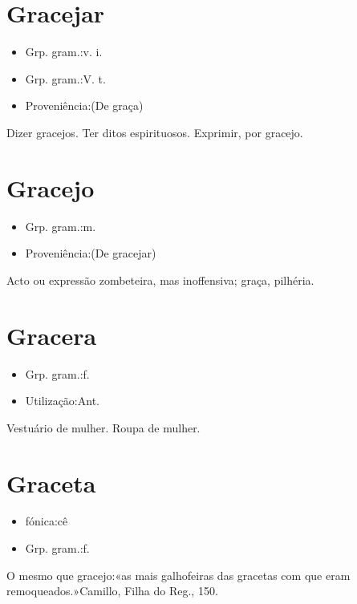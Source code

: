 \section{Gracejar}
\begin{itemize}
\item {Grp. gram.:v. i.}
\end{itemize}
\begin{itemize}
\item {Grp. gram.:V. t.}
\end{itemize}
\begin{itemize}
\item {Proveniência:(De \textunderscore graça\textunderscore )}
\end{itemize}
Dizer gracejos.
Ter ditos espirituosos.
Exprimir, por gracejo.
\section{Gracejo}
\begin{itemize}
\item {Grp. gram.:m.}
\end{itemize}
\begin{itemize}
\item {Proveniência:(De \textunderscore gracejar\textunderscore )}
\end{itemize}
Acto ou expressão zombeteira, mas inoffensiva; graça, pilhéria.
\section{Gracera}
\begin{itemize}
\item {Grp. gram.:f.}
\end{itemize}
\begin{itemize}
\item {Utilização:Ant.}
\end{itemize}
Vestuário de mulher.
Roupa de mulher.
\section{Graceta}
\begin{itemize}
\item {fónica:cê}
\end{itemize}
\begin{itemize}
\item {Grp. gram.:f.}
\end{itemize}
O mesmo que \textunderscore gracejo\textunderscore :«\textunderscore as mais galhofeiras das gracetas com que eram remoqueados.\textunderscore »Camillo, \textunderscore Filha do Reg.\textunderscore , 150.
